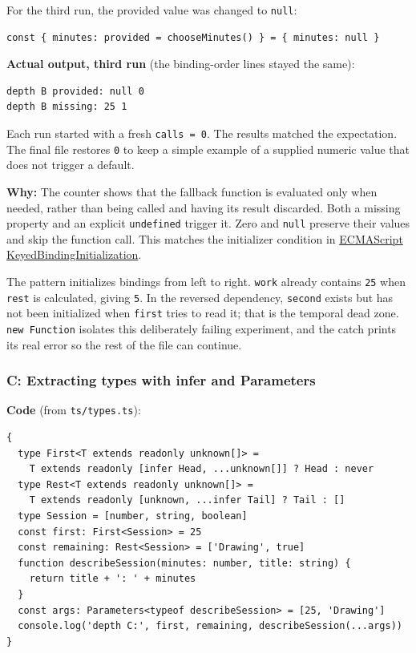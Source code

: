 \documentclass[
  11pt,
]{article}
\newcommand{\passthrough}[1]{#1}
\begin{document}
For the third run, the provided value was changed to
\passthrough{\lstinline!null!}:

\begin{lstlisting}
const { minutes: provided = chooseMinutes() } = { minutes: null }
\end{lstlisting}

\textbf{Actual output, third run} (the binding-order lines stayed the
same):

\begin{lstlisting}
depth B provided: null 0
depth B missing: 25 1
\end{lstlisting}

Each run started with a fresh \passthrough{\lstinline!calls = 0!}. The
results matched the expectation. The final file restores
\passthrough{\lstinline!0!} to keep a simple example of a supplied
numeric value that does not trigger a default.

\textbf{Why:} The counter shows that the fallback function is evaluated
only when needed, rather than being called and having its result
discarded. Both a missing property and an explicit
\passthrough{\lstinline!undefined!} trigger it. Zero and
\passthrough{\lstinline!null!} preserve their values and skip the
function call. This matches the initializer condition in
\href{https://tc39.es/ecma262/multipage/ecmascript-language-statements-and-declarations.html\#sec-runtime-semantics-keyedbindinginitialization}{ECMAScript
KeyedBindingInitialization}.

The pattern initializes bindings from left to right.
\passthrough{\lstinline!work!} already contains
\passthrough{\lstinline!25!} when \passthrough{\lstinline!rest!} is
calculated, giving \passthrough{\lstinline!5!}. In the reversed
dependency, \passthrough{\lstinline!second!} exists but has not been
initialized when \passthrough{\lstinline!first!} tries to read it; that
is the temporal dead zone. \passthrough{\lstinline!new Function!}
isolates this deliberately failing experiment, and the catch prints its
real error so the rest of the file can continue.

\subsubsection{C: Extracting types with infer and
Parameters}\label{c-extracting-types-with-infer-and-parameters}

\textbf{Code} (from \passthrough{\lstinline!ts/types.ts!}):

\begin{lstlisting}
{
  type First<T extends readonly unknown[]> =
    T extends readonly [infer Head, ...unknown[]] ? Head : never
  type Rest<T extends readonly unknown[]> =
    T extends readonly [unknown, ...infer Tail] ? Tail : []
  type Session = [number, string, boolean]
  const first: First<Session> = 25
  const remaining: Rest<Session> = ['Drawing', true]
  function describeSession(minutes: number, title: string) {
    return title + ': ' + minutes
  }
  const args: Parameters<typeof describeSession> = [25, 'Drawing']
  console.log('depth C:', first, remaining, describeSession(...args))
}
\end{lstlisting}
\end{document}
